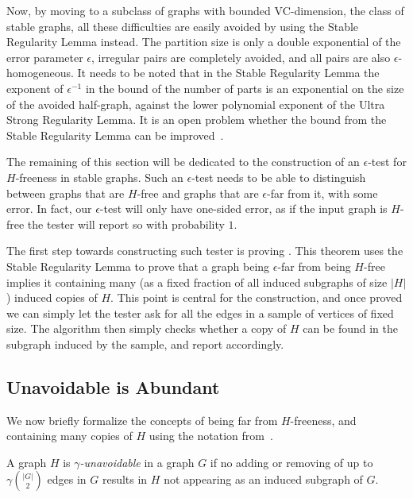     Now, by moving to a subclass of graphs with bounded VC-dimension, the class of stable graphs,
    all these difficulties are easily avoided by using the Stable Regularity Lemma instead.
    The partition size is only a double exponential of the error parameter $\epsilon$, irregular pairs are
    completely avoided, and all pairs are also $\epsilon$-homogeneous.
    It needs to be noted that in the Stable Regularity Lemma the exponent of $\epsilon^{-1}$ in the bound of the number
    of parts is an exponential on the size of the avoided half-graph, against the lower polynomial exponent of the
    Ultra Strong Regularity Lemma.
    It is an open problem whether the bound from the Stable Regularity Lemma can be improved~\cite{julia_cositas}.

    The remaining of this section will be dedicated to the construction of an $\epsilon$-test for $H$-freeness in stable graphs.
    Such an $\epsilon$-test needs to be able to distinguish between graphs that are $H$-free and graphs that
    are $\epsilon$-far from it, with some error.
    In fact, our $\epsilon$-test will only have one-sided error, as if the input graph is $H$-free the tester will
    report so with probability $1$.

    The first step towards constructing such tester is proving .
    This theorem uses the Stable Regularity Lemma to prove that a graph being $\epsilon$-far
    from being $H$-free implies it containing many (as a fixed fraction of all induced subgraphs of size $|H|$)
    induced copies of $H$.
    This point is central for the construction, and once proved we can simply let the tester ask for all the edges
    in a sample of vertices of fixed size.
    The algorithm then simply checks whether a copy of $H$ can be found in the subgraph induced by the sample, and report
    accordingly.

    \subsection{Unavoidable is Abundant} \label{subsec:subsection_6.1}

        We now briefly formalize the concepts of being far from $H$-freeness, and containing many copies of $H$ using the
        notation from~\cite{efficient_testing_of_large_graphs}.

        \begin{definition} \label{def:unavoidable}
            A graph $H$ is \emph{$\gamma$-unavoidable} in a graph $G$ if no adding or removing of up to $\gamma {|G| \choose 2}$
            edges in $G$ results in $H$ not appearing as an induced subgraph of $G$.
        \end{definition}

